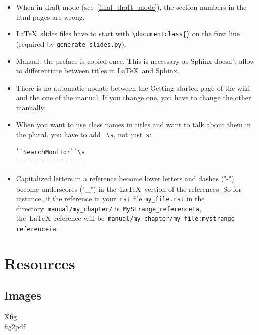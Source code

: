 \documentclass[a4paper,10pt]{article}
\newcommand{\code}[1]{\texttt{#1}}
\begin{document}
\begin{itemize}
 \item When in draft mode (see~\ref{final_draft_mode}), the section numbers in the html pages are wrong. 
 \item \LaTeX\ slides files have to start with \code{\textbackslash documentclass\{\}} on the first line (required by \code{generate\_slides.py}).
 \item Manual: the preface is copied once. This is necessary as Sphinx doesn't allow to differentiate between titles in \LaTeX\ and Sphinx.
 \item There is no automatic update between the Getting started page of the wiki and the one of the manual. If you change one, you have to change the other manually. 
 \item When you want to use class names in titles and want to talk about them in the plural, you have to add ~\verb+\s+, not just~\verb+s+:
  \begin{verbatim}
``SearchMonitor``\s
-------------------
  \end{verbatim}

  \item Capitalized letters in a reference become lower letters and dashes ("-") become underscores ("\_") in the~\LaTeX\ version of the references. So for instance, if the reference in your~\code{rst} file \code{my\_file.rst} in the directory~\code{manual/my\_chapter/} is~\code{MyStrange\_referenceIa}, the~\LaTeX~reference will be~\code{manual/my\_chapter/my\_file:mystrange-referenceia}. 
\end{itemize}

\section{Resources}

\subsection{Images}

\begin{description}
 \item[Xfig]
 \item[fig2pdf]
 \end{description}
\end{document}
